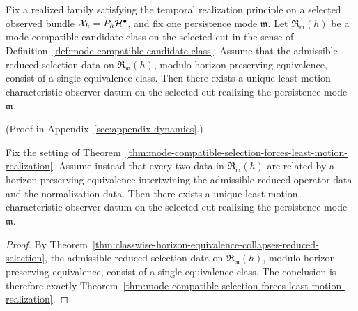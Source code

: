 \begin{theorem}
\label{thm:mode-compatible-selection-forces-least-motion-realization}
Fix a realized family satisfying the temporal realization principle on a
selected observed bundle \(\mathcal X_h=P_h\mathcal{H}^\bullet\), and fix one
persistence mode \(\mathfrak m\). Let
\(\mathfrak R_{\mathfrak m}(h)\) be a mode-compatible candidate class on the
selected cut in the sense of
Definition~\ref{def:mode-compatible-candidate-class}. Assume that the
admissible reduced selection data on
\(\mathfrak R_{\mathfrak m}(h)\), modulo horizon-preserving equivalence,
consist of a single equivalence class. Then there exists a unique least-motion
characteristic observer datum on the selected cut realizing the persistence
mode \(\mathfrak m\).
\end{theorem}

(Proof in Appendix~\ref{sec:appendix-dynamics}.)

\begin{corollary}
\label{cor:equivalence-compatible-mode-selection-forces-least-motion-realization}
Fix the setting of
Theorem~\ref{thm:mode-compatible-selection-forces-least-motion-realization}.
Assume instead that every two data in \(\mathfrak R_{\mathfrak m}(h)\) are
related by a horizon-preserving equivalence intertwining the admissible
reduced operator data and the normalization data. Then there exists a
unique least-motion characteristic observer datum on the selected cut
realizing the persistence mode \(\mathfrak m\).
\end{corollary}

\begin{proof}
By
Theorem~\ref{thm:classwise-horizon-equivalence-collapses-reduced-selection},
the admissible reduced selection data on \(\mathfrak R_{\mathfrak m}(h)\),
modulo horizon-preserving equivalence, consist of a single equivalence class.
The conclusion is therefore exactly
Theorem~\ref{thm:mode-compatible-selection-forces-least-motion-realization}.
\end{proof}

